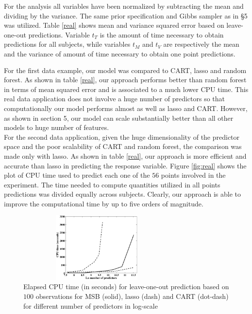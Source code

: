 \documentclass{article}
\begin{document}
For the analysis all variables have been normalized by subtracting the mean and dividing by the variance. The same prior specification and Gibbs sampler as in \S 5 was  utilized. Table \ref{real} shows mean and variance squared error based on leave-one-out predictions. Variable $t_{T}$ is the amount of time necessary to obtain predictions for all subjects, while variables $t_M$ and $t_V$ are respectively the mean and the variance of amount of time necessary to obtain one point predictions.

 For the first data example, our model was compared to CART, lasso and random forest. As shown in table \ref{real}, our approach performs better than random forest in terms of mean squared error and is associated to a much lower CPU time. This real data application does not involve a huge number of predictors so that computationally our model performs almost as well as lasso and CART. However, as  shown in section 5, our model can scale substantially better than all other models to huge number of features. \\
 
 For the second data application, given the huge dimensionality of the predictor space and the poor scalability of CART and random forest, the comparison was made only with lasso. As shown in table \ref{real}, our approach is more efficient and accurate than lasso in predicting the response variable. Figure \ref{fig:real} shows the plot of CPU time used to predict each one of the $56$ points involved in the experiment. The time needed to compute quantities utilized in all points predictions was divided equally across subjects. Clearly, our approach is able to improve the computational time by up to five orders of magnitude.


\newpage
\nocite{langley00}



\begin{figure}
\centering
\includegraphics[width=80mm,height=35mm]{Cpu.eps}
\caption{Elapsed CPU time (in seconds) for leave-one-out prediction based on $100$ observations for MSB (solid), lasso (dash) and CART (dot-dash) for different number of predictors in log-scale} \label{Cpu}
\end{figure}
\end{document}
